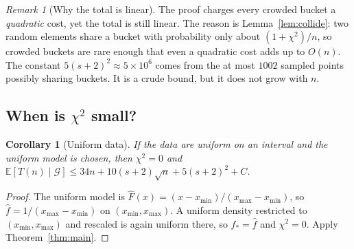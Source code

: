 \documentclass[11pt]{article}
\newtheorem{corollary}[theorem]{Corollary}
\theoremstyle{definition}
\theoremstyle{remark}
\newtheorem{remark}[theorem]{Remark}
\newcommand{\Fh}{\widehat{F}}
\newcommand{\fh}{\widehat{f}}
\newcommand{\E}{\mathbb{E}}
\newcommand{\xmin}{x_{\min}}
\newcommand{\xmax}{x_{\max}}
\newcommand{\G}{\mathcal{G}}
\begin{document}
\begin{remark}[Why the total is linear]
The proof charges every crowded bucket a \emph{quadratic} cost, yet the
total is still linear. The reason is Lemma~\ref{lem:collide}: two random
elements share a bucket with probability only about $(1+\chi^2)/n$, so
crowded buckets are rare enough that even a quadratic cost adds up to
$O(n)$. The constant $5(s+2)^2\approx5\times10^6$ comes from the at most
$1002$ sampled points possibly sharing buckets. It is a crude bound, but it
does not grow with $n$.
\end{remark}

\subsection{When is \texorpdfstring{$\chi^2$}{chi-squared} small?}

\begin{corollary}[Uniform data]\label{cor:uniform}
If the data are uniform on an interval and the uniform model is chosen,
then $\chi^2=0$ and
$\E[T(n)\mid\G]\le34n+10(s+2)\sqrt n+5(s+2)^2+C$.
\end{corollary}
\begin{proof}
The uniform model is $\Fh(x)=(x-\xmin)/(\xmax-\xmin)$, so
$\fh=1/(\xmax-\xmin)$ on $(\xmin,\xmax)$. A uniform density restricted to
$(\xmin,\xmax)$ and rescaled is again uniform there, so $f_\ast=\fh$ and
$\chi^2=0$. Apply Theorem~\ref{thm:main}.
\end{proof}
\end{document}
